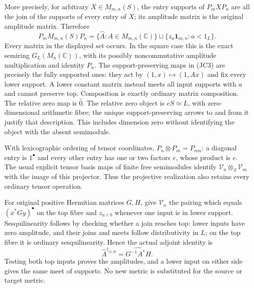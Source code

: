 \documentclass[11pt,a4paper]{article}
\theoremstyle{definition}\newtheorem{definition}[theorem]{Definition}
\begin{document}
More precisely, for arbitrary $X\in M_{m,n}(S)$, the entry supports
of $P_mXP_n$ are all the join of the supports of every entry of $X$;
its amplitude matrix is the original amplitude matrix. Therefore
\[
 P_mM_{m,n}(S)P_n
 =\{\widehat A:A\in M_{m,n}(\mathbb C)\}
       \sqcup\{z_a\mathbf1_{m,n}:a<1_L\}.
 \tag{JC3}
\]
Every matrix in the displayed set occurs. In the square case this
is the exact semiring $G_L(M_n(\mathbb C))$, with its possibly
noncommutative amplitude multiplication and identity $P_n$.
The support-preserving maps in (JC3) are precisely the fully
supported ones: they act by $(1,x)\mapsto(1,Ax)$ and fix every
lower support. A lower constant matrix instead meets all input
supports with $a$ and cannot preserve top. Composition is exactly
ordinary matrix composition. The relative zero map is $\widehat0$.
The relative zero object is $eS\simeq L$, with zero-dimensional
arithmetic fibre; the unique support-preserving arrows to and from
it justify that description. This includes dimension zero without
identifying the object with the absent semimodule.

With lexicographic ordering of tensor coordinates,
$P_n\otimes P_m=P_{nm}$: a diagonal entry is $1^\bullet$ and
every other entry has one or two factors $e$, whose product is $e$.
The usual explicit tensor basis maps of finite free semimodules
identify $\mathcal V_n\otimes_S\mathcal V_m$ with the image of
this projector. Thus the projective realization also retains every
ordinary tensor operation.

For original positive Hermitian matrices $G,H$, give $\mathcal V_n$
the pairing which equals $(x^*Gy)^\bullet$ on the top fibre and
$z_{a\wedge b}$ whenever one input is in lower support.
Sesquilinearity follows by checking whether a join reaches top:
lower inputs have zero amplitude, and their joins and meets follow
distributivity in $L$; on the top fibre it is ordinary
sesquilinearity. Hence the actual adjoint identity is
\[
 \widehat A^{\dagger_{G,H}}=\widehat{G^{-1}A^*H}.
 \tag{JC4}
\]
Testing both top inputs proves the amplitudes, and a lower input
on either side gives the same meet of supports. No new metric
is substituted for the source or target metric.
\end{document}
